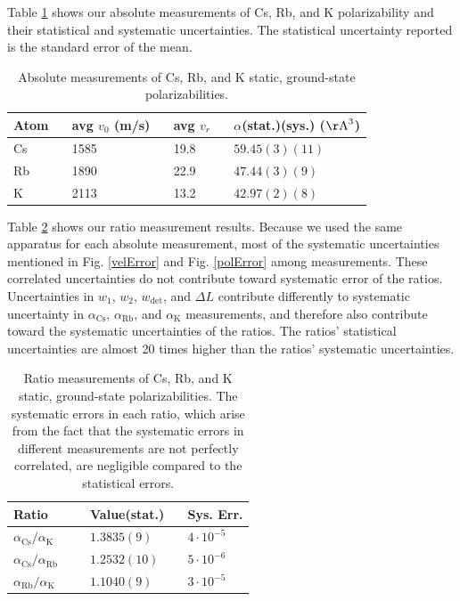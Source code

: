 \documentclass[twocolumn,prl,showpacs,superscriptaddress]{revtex4-1}   %
\newcommand{\sspace}{$\enspace$}
\newcommand{\ssspace}{$\quad$}
\newcommand{\figref}[1]{Fig. \ref{#1}}
\newcommand{\ak}{\alpha_{\textrm{K}}}
\newcommand{\arb}{\alpha_{\textrm{Rb}}}
\newcommand{\acs}{\alpha_{\textrm{Cs}}}
\newcommand{\polK}{42.97(2)(8)}
\newcommand{\polRb}{47.44(3)(9)}
\newcommand{\polCs}{59.45(3)(11)}
\newcommand{\ratRbK}{1.1040(9)}
\newcommand{\ratCsK}{1.3835(9)}
\newcommand{\ratCsRb}{1.2532(10)}
\newcommand{\AAA}{\mathrm{\AA}}
\begin{document}
Table \ref{tableAbs} shows our absolute measurements of Cs, Rb, and K polarizability and their statistical and systematic uncertainties. The statistical uncertainty reported is the standard error of the mean.

\begingroup
\begin{table}
\caption{\label{tableAbs}Absolute measurements of Cs, Rb, and K static, ground-state polarizabilities.}
\begin{center}
\begin{tabular}{llll}
\hline\hline
Atom \sspace & avg $v_0$ (m/s) \sspace & avg $v_r$ \sspace & $\alpha$(stat.)(sys.) ($\AAA^3$) \\
\hline
Cs & 1585 & 19.8 & $\polCs$ \\
Rb & 1890 & 22.9 & $\polRb$ \\
K  & 2113 & 13.2 & $\polK$ \\
\hline\hline
\end{tabular}
\end{center}
\end{table}
\endgroup

Table \ref{tableRatio} shows our ratio measurement results. 
Because we used the same apparatus for each absolute measurement,
most of the systematic uncertainties mentioned in \figref{velError} and \figref{polError} among measurements.
These correlated uncertainties do not contribute toward systematic error of the ratios. 
Uncertainties in $w_1$, $w_2$, $w_{\mathrm{det}}$, and $\Delta L$ contribute differently to systematic uncertainty in $\acs$, $\arb$, and $\ak$ measurements, and therefore also contribute toward the systematic uncertainties of the ratios.
The ratios' statistical uncertainties are almost 20 times higher than the ratios' systematic uncertainties.

\begingroup
\begin{table}
\caption{\label{tableRatio}Ratio measurements of Cs, Rb, and K static, ground-state polarizabilities. The systematic errors in each ratio, which arise from the fact that the systematic errors in different measurements are not perfectly correlated, are negligible compared to the statistical errors.}
\begin{center}
\begin{tabular}{lll}
\hline\hline
Ratio \ssspace \ssspace & Value(stat.) \sspace & Sys. Err. \\
\hline
$\acs/\ak$  & $\ratCsK$ & $4\cdot 10^{-5}$  \\
$\acs/\arb$ & $\ratCsRb$ & $5\cdot 10^{-6}$ \\
$\arb/\ak$  & $\ratRbK$ & $3\cdot 10^{-5}$ \\
\hline\hline
\end{tabular}
\end{center}
\end{table}
\endgroup
\end{document}
